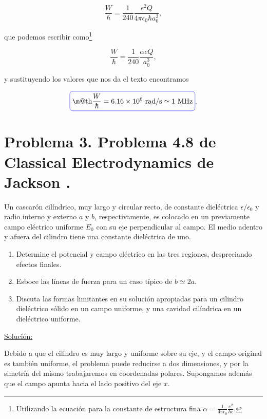 \documentclass[a4paper,11pt]{article}
\makeatletter
\numberwithin{equation}{section}
\newcommand*{\boxcolor}{blue}
\renewcommand{\boxed}[1]{\textcolor{\boxcolor}{%
\tikz[baseline={([yshift=-1ex]current bounding box.center)}] \node [rectangle, minimum width=1ex,rounded corners,draw] {\normalcolor\m@th$\displaystyle#1$};}}
\makeatother
\begin{document}
\begin{equation}
 \frac{W}{\hbar} = \frac{1}{240}\frac{e^2Q}{4\pi\epsilon_0\hbar a_0^3},
\end{equation}

que podemos escribir como\footnote{Utilizando la ecuación para la constante 
de estructura fina $\alpha = \frac{1}{4\pi\epsilon_0}\frac{e^2}{\hbar c}$.}

\begin{equation}
 \frac{W}{\hbar} = \frac{1}{240}\frac{\alpha c Q}{a_0^3},
\end{equation}

y sustituyendo los valores que nos da el texto encontramos 

\begin{equation}
 \boxed{\frac{W}{\hbar} = 6.16 \times 10^6 \text{ rad/s} \simeq 1 \text{ MHz}}.
\end{equation}

\newpage

\section{Problema 3. Problema 4.8 de Classical Electrodynamics
de Jackson \cite{jackson}.}

Un cascarón cilíndrico, muy largo y circular recto, de constante dieléctrica 
$\epsilon/\epsilon_0$ y radio interno y externo $a$ y $b$, respectivamente, 
es colocado en un previamente campo eléctrico uniforme $E_0$ con su eje perpendicular 
al campo. El medio adentro y afuera del cilindro tiene una constante dieléctrica de 
uno.

\begin{enumerate}[label=\textbf{(\alph*)}]
\item Determine el potencial y campo eléctrico en las tres regiones, despreciando 
efectos finales.
\item Esboce las líneas de fuerza para un caso típico de $b \simeq 2a$.
\item Discuta las formas limitantes en su solución apropiadas para un cilindro 
dieléctrico sólido en un campo uniforme, y una cavidad cilíndrica en un dieléctrico 
uniforme.
\end{enumerate}

\vspace{.3cm}

\underline{Solución:} \vspace{.3cm}

Debido a que el cilindro es muy largo y uniforme sobre su eje, y el campo original 
es también uniforme, el problema puede reducirse a dos dimensiones, y por la simetría 
del mismo trabajaremos en coordenadas polares. Supongamos además que el campo apunta 
hacia el lado positivo del eje $x$. 
\end{document}

